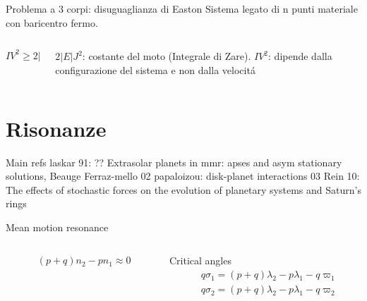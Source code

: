 \begin{frame}{Problema a 3 corpi: disuguaglianza di Easton}
Sistema legato di n punti materiale con baricentro fermo.
\begin{columns}[T]
\begin{column}{0.5\textwidth}
\begin{equation*}
IV^2\geq2|E|J^2
\end{equation*}
\end{column}
\begin{column}{0.5\textwidth}
$2|E|J^2$: costante del moto (Integrale di Zare).
$IV^2$: dipende dalla configurazione del sistema e non dalla velocit\'a
\end{column}
\end{columns}
\end{frame}

\section{Risonanze}

\begin{frame}{Main refs}
laskar 91: ??
Extrasolar planets in mmr: apses and asym stationary solutions, Beauge Ferraz-mello 02
papaloizou: disk-planet interactions 03
Rein 10: The effects of stochastic forces on the evolution of planetary systems and Saturn’s rings
\end{frame}

\begin{frame}{Mean motion resonance}
\begin{columns}[T]\begin{column}{0.5\textwidth}
\begin{align*}
&(p+q)n_2-pn_1\approx0
\end{align*}
\end{column}\begin{column}{0.5\textwidth}
Critical angles
\begin{align*}
&q\sigma_1=(p+q)\lambda_2-p\lambda_1-q\varpi_1\\
&q\sigma_2=(p+q)\lambda_2-p\lambda_1-q\varpi_2
\end{align*}
\end{column}\end{columns}
\end{frame}
